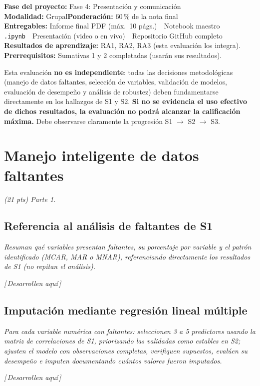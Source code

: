 \documentclass[11pt,a4paper]{article}
\newcommand{\guia}[1]{{\small\itshape\color{gris}#1}\par\vspace{0.15em}}
\newcommand{\resp}{{\footnotesize\itshape\color{fillgray}[\,Desarrollen aquí\,]}\par\vspace{1.1em}}
\begin{document}
\clearpage
{}
\begin{infobox}
\textbf{Fase del proyecto:} Fase 4: Presentación y comunicación\\
\textbf{Modalidad:} Grupal\qquad\textbf{Ponderación:} 60\,\% de la nota final\\
\textbf{Entregables:} Informe final PDF (máx.\ 10 págs.)\ \textperiodcentered\ Notebook maestro \texttt{.ipynb}\ \textperiodcentered\ Presentación (video o en vivo)\ \textperiodcentered\ Repositorio GitHub completo\\
\textbf{Resultados de aprendizaje:} RA1, RA2, RA3 (esta evaluación los integra).\\
\textbf{Prerrequisitos:} Sumativas 1 y 2 completadas (usarán sus resultados).
\end{infobox}
\begin{conexionbox}
Esta evaluación \textbf{no es independiente}: todas las decisiones metodológicas (manejo de datos faltantes, selección de variables, validación de modelos, evaluación de desempeño y análisis de robustez) deben fundamentarse directamente en los hallazgos de S1 y S2. \textbf{Si no se evidencia el uso efectivo de dichos resultados, la evaluación no podrá alcanzar la calificación máxima.} Debe observarse claramente la progresión S1 $\to$ S2 $\to$ S3.
\end{conexionbox}

\vspace{0.5em}
\tableofcontents
\newpage

\section{Manejo inteligente de datos faltantes}
\guia{(21 pts) Parte 1.}

\subsection{Referencia al análisis de faltantes de S1}
\guia{Resuman qué variables presentan faltantes, su porcentaje por variable y el patrón identificado (MCAR, MAR o MNAR), referenciando directamente los resultados de S1 (no repitan el análisis).}
\resp

\subsection{Imputación mediante regresión lineal múltiple}
\guia{Para cada variable numérica con faltantes: seleccionen 3 a 5 predictores usando la matriz de correlaciones de S1, priorizando las validadas como estables en S2; ajusten el modelo con observaciones completas, verifiquen supuestos, evalúen su desempeño e imputen documentando cuántos valores fueron imputados.}
\resp
\end{document}
